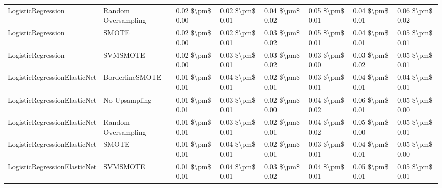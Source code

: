 \begin{tabular}{llllllll}
             LogisticRegression &           Random Oversampling & 0.02 \$\textbackslash pm\$ 0.00 &           0.02 \$\textbackslash pm\$ 0.01 &       0.04 \$\textbackslash pm\$ 0.02 &        0.05 \$\textbackslash pm\$ 0.01 &                         0.04 \$\textbackslash pm\$ 0.01 &     0.06 \$\textbackslash pm\$ 0.02 \\
             LogisticRegression &                         SMOTE & 0.02 \$\textbackslash pm\$ 0.00 &           0.02 \$\textbackslash pm\$ 0.01 &       0.03 \$\textbackslash pm\$ 0.02 &        0.05 \$\textbackslash pm\$ 0.01 &                         0.04 \$\textbackslash pm\$ 0.01 &     0.05 \$\textbackslash pm\$ 0.01 \\
             LogisticRegression &                      SVMSMOTE & 0.02 \$\textbackslash pm\$ 0.00 &           0.03 \$\textbackslash pm\$ 0.01 &       0.03 \$\textbackslash pm\$ 0.02 &        0.03 \$\textbackslash pm\$ 0.00 &                         0.03 \$\textbackslash pm\$ 0.02 &     0.05 \$\textbackslash pm\$ 0.01 \\
   LogisticRegressionElasticNet &               BorderlineSMOTE & 0.01 \$\textbackslash pm\$ 0.01 &           0.04 \$\textbackslash pm\$ 0.01 &       0.02 \$\textbackslash pm\$ 0.01 &        0.03 \$\textbackslash pm\$ 0.01 &                         0.04 \$\textbackslash pm\$ 0.01 &     0.04 \$\textbackslash pm\$ 0.01 \\
   LogisticRegressionElasticNet &                 No Upsampling & 0.01 \$\textbackslash pm\$ 0.01 &           0.03 \$\textbackslash pm\$ 0.01 &       0.02 \$\textbackslash pm\$ 0.00 &        0.04 \$\textbackslash pm\$ 0.02 &                         0.06 \$\textbackslash pm\$ 0.01 &     0.05 \$\textbackslash pm\$ 0.00 \\
   LogisticRegressionElasticNet &           Random Oversampling & 0.01 \$\textbackslash pm\$ 0.01 &           0.03 \$\textbackslash pm\$ 0.01 &       0.02 \$\textbackslash pm\$ 0.01 &        0.04 \$\textbackslash pm\$ 0.02 &                         0.05 \$\textbackslash pm\$ 0.00 &     0.05 \$\textbackslash pm\$ 0.01 \\
   LogisticRegressionElasticNet &                         SMOTE & 0.01 \$\textbackslash pm\$ 0.01 &           0.04 \$\textbackslash pm\$ 0.01 &       0.02 \$\textbackslash pm\$ 0.01 &        0.03 \$\textbackslash pm\$ 0.01 &                         0.04 \$\textbackslash pm\$ 0.01 &     0.05 \$\textbackslash pm\$ 0.00 \\
   LogisticRegressionElasticNet &                      SVMSMOTE & 0.01 \$\textbackslash pm\$ 0.01 &           0.04 \$\textbackslash pm\$ 0.01 &       0.03 \$\textbackslash pm\$ 0.02 &        0.04 \$\textbackslash pm\$ 0.01 &                         0.05 \$\textbackslash pm\$ 0.01 &     0.05 \$\textbackslash pm\$ 0.01 \\

\end{tabular}
